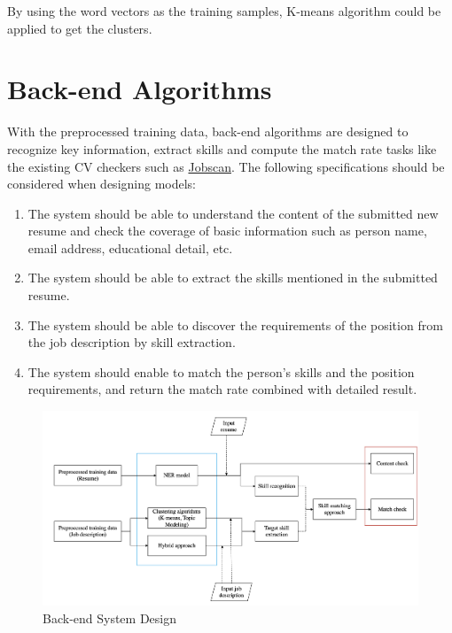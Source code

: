 By using the word vectors as the training samples, K-means algorithm could be applied to get the clusters. 

\section{Back-end Algorithms}
\label{sec:backend_design}

With the preprocessed training data, back-end algorithms are designed to recognize key information, extract skills and compute the match rate tasks like the existing CV checkers such as \href{https://www.jobscan.co/}{Jobscan}. The following specifications should be considered when designing models:

\begin{enumerate}
    \item The system should be able to understand the content of the submitted new resume and check the coverage of basic information such as person name, email address, educational detail, etc.
    
    \item The system should be able to extract the skills mentioned in the submitted resume.
    
    \item The system should be able to discover the requirements of the position from the job description by skill extraction.
    
    \item The system should enable to match the person's skills and the position requirements, and return the match rate combined with detailed result.
\end{enumerate}

 \begin{figure}[H]
    \centering
    \includegraphics[width=1.2\textwidth]{images/backend_design.png}
    \caption{Back-end System Design}
    \label{fig:18}
\end{figure}

